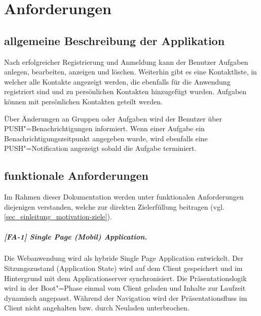 \chapter{Anforderungen}
\label{chp_anforderungen}

\section{allgemeine Beschreibung der Applikation}
\label{sec_anfroderungen_allgemeine-beschreibung}

Nach erfolgreicher Registrierung und Anmeldung kann der Benutzer Aufgaben anlegen, bearbeiten, anzeigen und löschen. Weiterhin gibt es eine Kontaktliste, in welcher alle Kontakte angezeigt werden, die ebenfalls für die Anwendung registriert sind und zu persönlichen Kontakten hinzugefügt wurden. Aufgaben können mit persönlichen Kontakten geteilt werden. 

Über Änderungen an Gruppen oder Aufgaben wird der Benutzer über PUSH"=Benachrichtigungen informiert. Wenn einer Aufgabe ein Benachrichtigungszeitpunkt angegeben wurde, wird ebenfalls eine PUSH"=Notification angezeigt sobald die Aufgabe terminiert.


\newpage
\section{funktionale Anforderungen}
\label{sec_anforderungen_funktionale-anforderungen}

Im Rahmen dieser Dokumentation werden unter funktionalen Anforderungen diejenigen verstanden, welche zur direkten Zielerfüllung beitragen (vgl. \ref{sec_einleitung_motivation-ziele}).


\paragraph{[FA-1] Single Page (Mobil) Application.} Die Webanwendung wird als hybride Single Page Application entwickelt. Der Sitzungszustand (\glqq Application State\grqq) wird auf dem Client gespeichert und im Hintergrund mit dem Applicationserver synchronisiert. Die Präsentationslogik wird in der \glqq Boot"=Phase\grqq{} einmal vom Client geladen und Inhalte zur Laufzeit dynamisch angepasst. Während der Navigation wird der Präsentationsfluss im Client nicht angehalten bzw. durch \glqq Neuladen\grqq{} unterbrochen.

